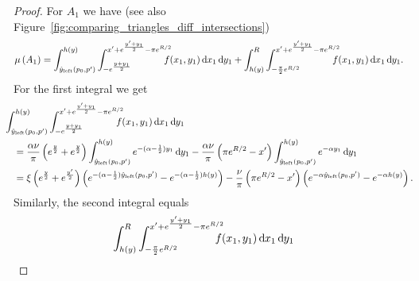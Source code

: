 \begin{proof}
For $A_1$ we have (see also Figure~\ref{fig:comparing_triangles_diff_intersections})
\begin{align*}
	\Mu{A_1} &= \int_{\hat{y}_{\text{left}}(p_0,p^\prime)}^{h(y)} 
		\int_{- e^{\frac{y + y_1}{2}}}^{x^\prime + e^{\frac{y^\prime+y_1}{2}} - \pi e^{R/2}} \hspace{-10pt} 
		f(x_1,y_1) \dd x_1 \dd y_1
		+ \int_{h(y)}^{R} \int_{-\frac{\pi}{2}e^{R/2}}^{x^\prime + e^{\frac{y^\prime+y_1}{2}} - \pi e^{R/2}} 
		\hspace{-10pt}  f(x_1,y_1) \dd x_1 \dd y_1.
\end{align*}
For the first integral we get
\begin{align*}
	&\hspace{-10pt}\int_{\hat{y}_{\text{left}}(p_0,p^\prime)}^{h(y)} 
		\int_{- e^{\frac{y + y_1}{2}}}^{x^\prime + e^{\frac{y^\prime+y_1}{2}} - \pi e^{R/2}} \hspace{-10pt} 
		f(x_1,y_1) \dd x_1 \dd y_1\\
	&= \frac{\alpha \nu}{\pi}\left(e^{\frac{y}{2}} + e^{\frac{y}{2}}\right) 	
		\int_{\hat{y}_{\text{left}}(p_0,p^\prime)}^{h(y)} e^{-(\alpha - \frac{1}{2})y_1} \dd y_1
		- \frac{\alpha \nu}{\pi}\left(\pi e^{R/2} - x^\prime \right) 
		\int_{\hat{y}_{\text{left}}(p_0,p^\prime)}^{h(y)} e^{-\alpha y_1} \dd y_1\\
	&= \xi \left(e^{\frac{y}{2}} + e^{\frac{y^\prime}{2}}\right)
		\left(e^{-(\alpha - \frac{1}{2})\hat{y}_{\text{left}}(p_0,p^\prime)}
		- e^{-(\alpha - \frac{1}{2})h(y)}\right)
		- \frac{\nu}{\pi} \left(\pi e^{R/2} - x^\prime\right)
		\left(e^{-\alpha\hat{y}_{\text{left}}(p_0,p^\prime)}
		- e^{-\alpha h(y)}\right).
\end{align*}
Similarly, the second integral equals
\begin{align*}
	&\hspace{-20pt}\int_{h(y)}^{R} \int_{-\frac{\pi}{2}e^{R/2}}^{x^\prime + e^{\frac{y^\prime+y_1}{2}} - \pi e^{R/2}} 
		\hspace{-10pt}  f(x_1,y_1) \dd x_1 \dd y_1\\

\end{align*}
\end{proof}
